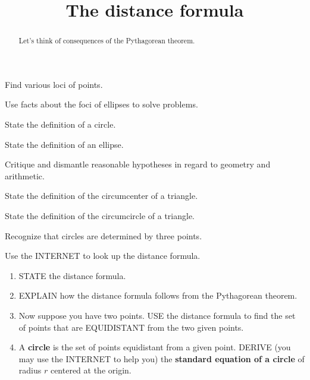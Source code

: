 \documentclass[nooutcomes,noauthor,handout]{ximera}
\title{The distance formula}
\begin{document}
\begin{abstract}
  Let's think of consequences of the Pythagorean theorem.
\end{abstract}
\maketitle


\begin{listOutcomes}
\item Find various loci of points.
\item Use facts about the foci of ellipses to solve problems.
\item State the definition of a circle.
\item State the definition of an ellipse.
\item{Critique and dismantle reasonable hypotheses in regard to geometry and arithmetic.}
\item State the definition of the circumcenter of a triangle.
\item State the definition of the circumcircle of a triangle.
\item Recognize that circles are determined by three points.
\end{listOutcomes}


\mynewpage



\begin{question}
  Use the INTERNET to look up the distance formula. 
  \begin{enumerate}
    \item STATE the distance formula. 
    \item EXPLAIN how the distance formula follows from the
      Pythagorean theorem.
    \item Now suppose you have two points. USE the distance formula to
      find the set of points that are EQUIDISTANT from the two given
      points.
    \item A \textbf{circle} is the set of points equidistant from a
      given point. DERIVE (you may use the INTERNET to help you) the
      \textbf{standard equation of a circle} of radius $r$ centered at
      the origin.  
  \end{enumerate}
  \begin{freeResponse}
  \end{freeResponse}
\end{question}
\mynewpage
\end{document}
